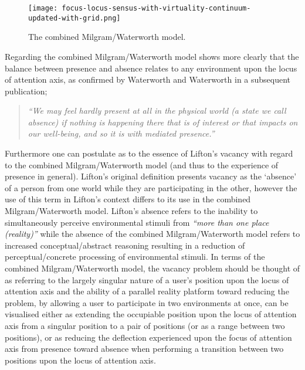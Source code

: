 \begin{figure}[h]
	\begin{center}
		\texttt{[image: focus-locus-sensus-with-virtuality-continuum-updated-with-grid.png]}
		\caption{The combined Milgram/Waterworth model.}
		\label{focus-locus-sensus-with-virtuality-continuum}
	\end{center}	
\end{figure}

Regarding the combined Milgram/Waterworth model shows more clearly that the balance between presence and absence relates to any environment upon the locus of attention axis, as confirmed by Waterworth and Waterworth in a subsequent publication;

\begin{quote}
	\textit{``We may feel hardly present at all in the physical world (a state we call absence) if nothing is happening there that is of interest or that impacts on our well-being, and so it is with mediated presence.''}~\cite{Waterworth2014}
\end{quote}

Furthermore one can postulate as to the essence of Lifton's vacancy with regard to the combined Milgram/Waterworth model (and thus to the experience of presence in general). Lifton's original definition presents vacancy as the `absence' of a person from one world while they are participating in the other, however the use of this term in Lifton's context differs to its use in the combined Milgram/Waterworth model. Lifton's absence refers to the inability to simultaneously perceive environmental stimuli from \textit{``more than one place (reality)''} while the absence of the combined Milgram/Waterworth model refers to increased conceptual/abstract reasoning resulting in a reduction of perceptual/concrete processing of environmental stimuli. In terms of the combined Milgram/Waterworth model, the vacancy problem should be thought of as referring to the largely singular nature of a user's position upon the locus of attention axis and the ability of a parallel reality platform toward reducing the problem, by allowing a user to participate in two environments at once, can be visualised either as extending the occupiable position upon the locus of attention axis from a singular position to a pair of positions (or as a range between two positions), or as reducing the deflection experienced upon the focus of attention axis from presence toward absence when performing a transition between two positions upon the locus of attention axis.

